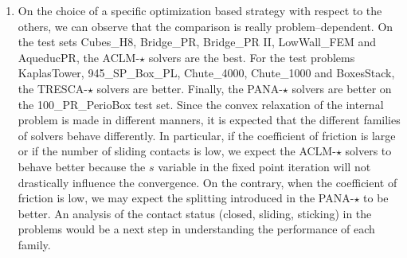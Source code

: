 \begin{enumerate}
\item On the choice of a specific optimization based strategy with respect to the others, we can observe that the comparison is really problem--dependent. On the test sets Cubes\_H8, Bridge\_PR,  Bridge\_PR II, LowWall\_FEM and AqueducPR, the {\sf ACLM-$\star$} solvers are the best.  For the test problems KaplasTower, 945\_SP\_Box\_PL, Chute\_4000, Chute\_1000 and BoxesStack, the {\sf TRESCA-$\star$} solvers are better. Finally, the {\sf PANA-$\star$} solvers are better on the 100\_PR\_PerioBox test set. Since the convex relaxation of the internal problem is made in different manners, it is expected that the different families  of solvers behave differently. In particular, if the coefficient of friction is large or if the number of sliding contacts is low, we expect the {\sf ACLM-$\star$} solvers to behave better because the $s$ variable in the fixed point iteration will not drastically influence the convergence. On the contrary, when the coefficient of friction is low, we may expect  the splitting introduced in the {\sf PANA-$\star$} to be better. An analysis of the contact status (closed, sliding, sticking) in the problems would be a next step in understanding the performance of each family.
\end{enumerate}




